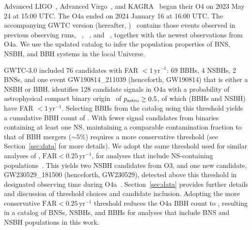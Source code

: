 Advanced LIGO~\citep{LIGOScientific:2014pky}, Advanced Virgo~\citep{VIRGO:2014yos}, and KAGRA~\citep{KAGRA:2020tym} began their \ac{O4} on 2023 May 24 at 15:00 UTC.  The \acf{O4a} ended on 2024 January 16 at 16:00 UTC.  The accompanying \ac{GWTC} version \thisgwtcversionfull{} (hereafter, \gwtcfour)~\citep{GWTC:Introduction,GWTC:Methods,GWTC:Results} contains those events observed in previous observing runs, ~\citep{LIGOScientific:2016dsl}, ~\citep{LIGOScientific:2018mvr}, and ~\citep{LIGOScientific:2020ibl,KAGRA:2021vkt,LIGOScientific:2021usb}, together with the newest observations from \ac{O4a}. We use the updated catalog to infer the population properties of \ac{BNS}, \ac{NSBH}, and \ac{BBH} systems in the local Universe.

\ac{GWTC}-3.0 included 76 candidates with \ac{FAR} $<1\,\text{yr}^{-1}$: 69 \acp{BBH}, 4 \acp{NSBH}, 2 \acp{BNS}, and one event GW190814\_211039 (henceforth, GW190814) that is either a \ac{NSBH} or \ac{BBH}.
\citet{GWTC:Results} identifies 128 candidate signals in \ac{O4a} with a probability of astrophysical compact binary origin~\citep{Farr:2013yna,LIGOScientific:2016kwr,Kapadia:2019uut,GWTC:Methods} of $p_{\rm astro}\ge0.5$, of which \counts[FAROnePerYear][O4aTotal] (\counts[FAROnePerYear][O4aBBH] \acp{BBH} and \counts[FAROnePerYear][O4aNSBH] \ac{NSBH}) have \ac{FAR} $<1\,\text{yr}^{-1}$. Selecting \acp{BBH} from the catalog using this threshold yields a cumulative \ac{BBH} count of \counts[FAROnePerYear][totalBBH].
With fewer signal candidates from binaries containing at least one \ac{NS}, maintaining a comparable contamination fraction to that of \ac{BBH} mergers (${\sim}5\%$) requires a more conservative threshold (see Section~\ref{sec:data} for more details).  We adopt the same threshold used for similar analyses of \gwtcthree, $\text{FAR}<0.25\,\text{yr}^{-1}$, for analyses that include \ac{NS}-containing populations~\citep{KAGRA:2021duu}. This yields two \ac{NSBH} candidates from O3, and one new candidate, GW230529\_181500 (henceforth, GW230529), detected above this threshold in designated observing time during \ac{O4a}~\citep{LIGOScientific:2024elc}.
Section~\ref{sec:data} provides further details and discussion of threshold choices and candidate inclusion.  Adopting the more conservative $\text{FAR}<0.25\,\text{yr}^{-1}$ threshold reduces the \ac{O4a} \ac{BBH} count to \counts[FAROnePerFourYears][O4aBBH], resulting in a catalog of \counts[FAROnePerFourYears][totalBNS] \acp{BNS}, \counts[FAROnePerFourYears][totalNSBH] \acp{NSBH}, and \counts[FAROnePerFourYears][totalBBH] \acp{BBH} for analyses that include \ac{BNS} and \ac{NSBH} populations in this work.

